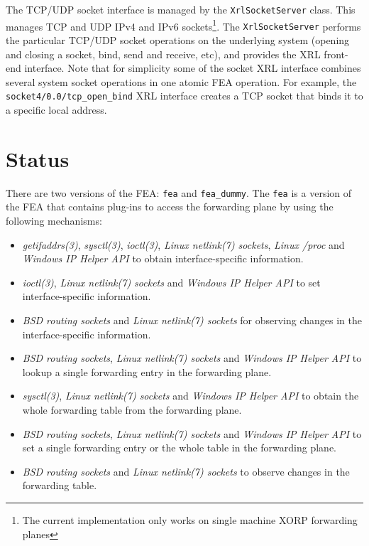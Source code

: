 \documentclass[11pt]{article}
\begin{document}
The TCP/UDP socket interface is managed by the {\tt XrlSocketServer}
class.  This manages TCP and UDP IPv4 and IPv6 sockets\footnote{The
current implementation only works on
single machine XORP forwarding planes}.  The {\tt XrlSocketServer}
performs the particular TCP/UDP socket operations on the underlying
system (opening and closing a socket, bind, send and receive, etc),
and provides the XRL front-end interface. Note that for simplicity
some of the socket XRL interface combines several system socket
operations in one atomic FEA operation. For example, the {\tt
  socket4/0.0/tcp\_open\_bind} XRL interface creates a TCP socket that
binds it to a specific local address.

\section{Status}
\label{sec:status}

There are two versions of the FEA: {\tt fea} and {\tt fea\_dummy}.
The {\tt fea} is a version
of the FEA that contains plug-ins to access the forwarding plane by
using the following mechanisms:

\begin{itemize}

  \item {\it getifaddrs(3)}, {\it sysctl(3)}, {\it ioctl(3)}, {\it Linux
  netlink(7) sockets}, {\it Linux /proc} and {\it Windows IP Helper
  API} to obtain interface-specific information.

  \item {\it ioctl(3)}, {\it Linux netlink(7) sockets} and {\it Windows
  IP Helper API} to set interface-specific information.

  \item {\it BSD routing sockets} and {\it Linux netlink(7) sockets} for
  observing changes in the interface-specific information.

  \item {\it BSD routing sockets}, {\it Linux netlink(7) sockets} and
  {\it Windows IP Helper API} to lookup a single forwarding entry in
  the forwarding plane.

  \item {\it sysctl(3)}, {\it Linux netlink(7) sockets} and {\it Windows
  IP Helper API} to obtain the whole forwarding table from the
  forwarding plane.

  \item {\it BSD routing sockets}, {\it Linux netlink(7) sockets} and
  {\it Windows IP Helper API} to set a single forwarding entry or the
  whole table in the forwarding plane.

  \item {\it BSD routing sockets} and {\it Linux netlink(7) sockets} to
  observe changes in the forwarding table.

\end{itemize}
\end{document}
